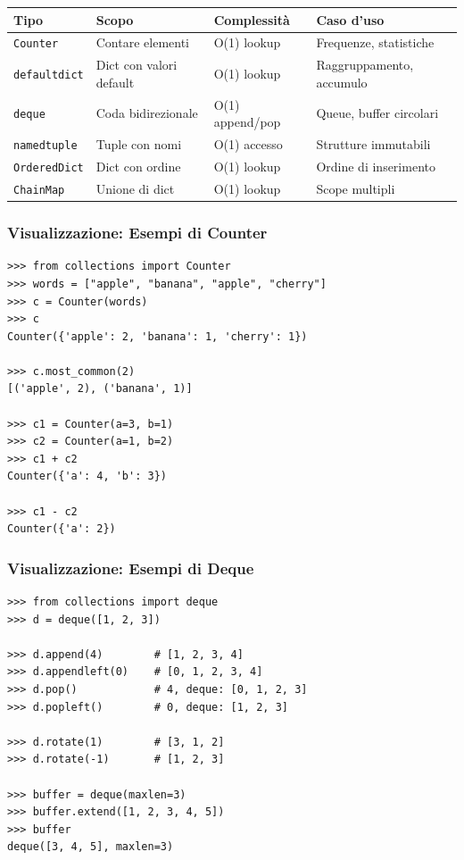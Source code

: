 \begin{center}
\begin{tabular}{|l|p{4cm}|p{3cm}|p{4cm}|}
\hline
\textbf{Tipo} & \textbf{Scopo} & \textbf{Complessità} & \textbf{Caso d'uso} \\
\hline
\texttt{Counter} & Contare elementi & O(1) lookup & Frequenze, statistiche \\
\hline
\texttt{defaultdict} & Dict con valori default & O(1) lookup & Raggruppamento, accumulo \\
\hline
\texttt{deque} & Coda bidirezionale & O(1) append/pop & Queue, buffer circolari \\
\hline
\texttt{namedtuple} & Tuple con nomi & O(1) accesso & Strutture immutabili \\
\hline
\texttt{OrderedDict} & Dict con ordine & O(1) lookup & Ordine di inserimento \\
\hline
\texttt{ChainMap} & Unione di dict & O(1) lookup & Scope multipli \\
\hline
\end{tabular}
\end{center}

\subsubsection{Visualizzazione: Esempi di Counter}

\begin{tcolorbox}[title=Output Terminal - Counter Operations]
\begin{lstlisting}[style=python]
>>> from collections import Counter
>>> words = ["apple", "banana", "apple", "cherry"]
>>> c = Counter(words)
>>> c
Counter({'apple': 2, 'banana': 1, 'cherry': 1})

>>> c.most_common(2)
[('apple', 2), ('banana', 1)]

>>> c1 = Counter(a=3, b=1)
>>> c2 = Counter(a=1, b=2)
>>> c1 + c2
Counter({'a': 4, 'b': 3})

>>> c1 - c2
Counter({'a': 2})
\end{lstlisting}
\end{tcolorbox}

\subsubsection{Visualizzazione: Esempi di Deque}

\begin{tcolorbox}[title=Output Terminal - Deque Operations]
\begin{lstlisting}[style=python]
>>> from collections import deque
>>> d = deque([1, 2, 3])

>>> d.append(4)        # [1, 2, 3, 4]
>>> d.appendleft(0)    # [0, 1, 2, 3, 4]
>>> d.pop()            # 4, deque: [0, 1, 2, 3]
>>> d.popleft()        # 0, deque: [1, 2, 3]

>>> d.rotate(1)        # [3, 1, 2]
>>> d.rotate(-1)       # [1, 2, 3]

>>> buffer = deque(maxlen=3)
>>> buffer.extend([1, 2, 3, 4, 5])
>>> buffer
deque([3, 4, 5], maxlen=3)
\end{lstlisting}
\end{tcolorbox}

